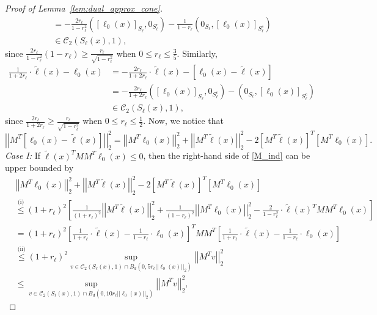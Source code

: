 \documentclass[ejsv2,noshowframe]{imsart}
\theoremstyle{plain}
\theoremstyle{definition}
\theoremstyle{remark}
\newcommand{\norm}[1]{\left|\left| #1 \right|\right|}
\renewcommand{\tilde}{\widetilde}
\begin{document}
\begin{proof}[Proof of Lemma~\ref{lem:dual_approx_cone}]
\begin{align*}
		&= -\frac{2r_{\ell}}{1-r_{\ell}^2} \left(\left[\ell_0(x)\right]_{S_{\ell}}, 0_{S_{\ell}^c}\right) - \frac{1}{1-r_{\ell}}\left(0_{S_{\ell}}, \left[\ell_0(x)\right]_{S_{\ell}^c}\right)\\
		&\in \mathcal{C}_2\left(S_{\ell}(x), 1\right),
	\end{align*}
	since $\frac{2r_{\ell}}{1-r_{\ell}^2} (1-r_{\ell}) \geq \frac{r_{\ell}}{\sqrt{1-r_{\ell}^2}}$ when $0\leq r_{\ell} \leq \frac{3}{5}$. Similarly, 
	\begin{align*}
		\frac{1}{1+2r_{\ell}} \cdot\tilde{\ell}(x) - \ell_0(x) &= -\frac{2r_{\ell}}{1+2r_{\ell}} \cdot \tilde{\ell}(x) - \left[\ell_0(x) -\tilde{\ell}(x)\right]\\
		&= -\frac{2r_{\ell}}{1+2r_{\ell}} \left(\left[\ell_0(x)\right]_{S_{\ell}}, 0_{S_{\ell}^c}\right) - \left(0_{S_{\ell}}, \left[\ell_0(x)\right]_{S_{\ell}^c}\right)\\
		&\in \mathcal{C}_2\left(S_{\ell}(x), 1\right),
	\end{align*}
	since $\frac{2r_{\ell}}{1+2r_{\ell}} \geq \frac{r_{\ell}}{\sqrt{1-r_{\ell}^2}}$ when $0\leq r_{\ell} \leq \frac{1}{2}$. Now, we notice that
	\begin{equation}
		\label{M_ind}
		\norm{M^T\left[\ell_0(x)-\tilde{\ell}(x)\right]}_2^2 = \norm{M^T\ell_0(x)}_2^2 + \norm{M^T \tilde{\ell}(x)}_2^2 - 2\left[M^T\tilde{\ell}(x)\right]^T\left[M^T\ell_0(x)\right].
	\end{equation}
	\emph{Case I:} If $\tilde{\ell}(x)^T MM^T \ell_0(x) \leq 0$, then the right-hand side of \eqref{M_ind}  can be upper bounded by
	\begin{align*}
		&\norm{M^T\ell_0(x)}_2^2 + \norm{M^T \tilde{\ell}(x)}_2^2 - 2\left[M^T\tilde{\ell}(x)\right]^T\left[M^T\ell_0(x)\right] \\
		&\stackrel{\text{(i)}}{\leq} (1+r_{\ell})^2\left[ \frac{1}{(1+r_{\ell})^2}\norm{M^T\tilde{\ell}(x)}_2^2 + \frac{1}{(1-r_{\ell})^2} \norm{M^T\ell_0(x)}_2^2 - \frac{2}{1-r_{\ell}^2} \cdot \tilde{\ell}(x)^T MM^T \ell_0(x)\right]\\
		&= (1+r_{\ell})^2 \left[\frac{1}{1+r_{\ell}} \cdot \tilde{\ell}(x) - \frac{1}{1-r_{\ell}} \cdot \ell_0(x)\right]^T MM^T \left[\frac{1}{1+r_{\ell}} \cdot \tilde{\ell}(x) - \frac{1}{1-r_{\ell}} \cdot \ell_0(x)\right]\\
		&\stackrel{\text{(ii)}}{\leq} (1+r_{\ell})^2 \sup_{v\in \mathcal{C}_2(S_{\ell}(x),1) \cap B_d\left(0,5r_{\ell}\norm{\ell_0(x)}_2\right)} \norm{M^Tv}_2^2\\
		&\leq \sup_{v\in \mathcal{C}_2(S_{\ell}(x),1) \cap B_d\left(0,10r_{\ell}\norm{\ell_0(x)}_2\right)} \norm{M^Tv}_2^2,

\end{align*}
\end{proof}
\end{document}
